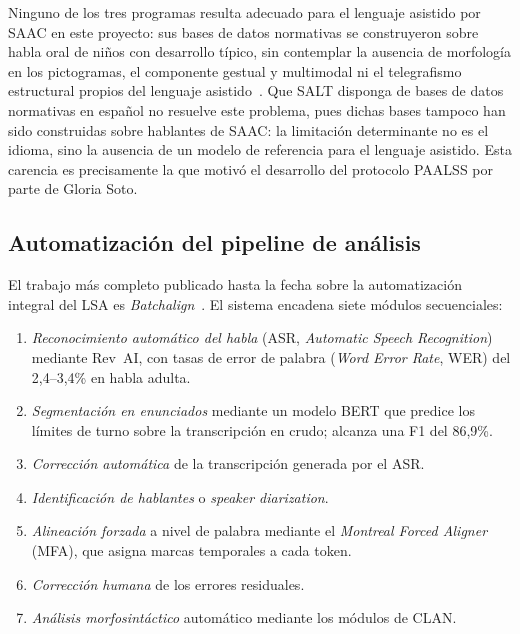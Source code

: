 Ninguno de los tres programas resulta adecuado para el lenguaje asistido por \ac{SAAC}
en este proyecto: sus bases de datos normativas se construyeron sobre habla oral de
niños con desarrollo típico, sin contemplar la ausencia de morfología en los
pictogramas, el componente gestual y multimodal ni el telegrafismo estructural propios
del lenguaje asistido~\cite{lsa_computer_programs}. Que \ac{SALT} disponga de bases de
datos normativas en español no resuelve este problema, pues dichas bases tampoco han
sido construidas sobre hablantes de \ac{SAAC}: la limitación determinante no es el
idioma, sino la ausencia de un modelo de referencia para el lenguaje asistido. Esta carencia es 
precisamente la que motivó el desarrollo del protocolo \ac{PAALSS} por parte de Gloria Soto.


\subsection{Automatización del pipeline de análisis}
\label{subsec:batchalign}

El trabajo más completo publicado hasta la fecha sobre la automatización integral del
\ac{LSA} es \emph{Batchalign}~\cite{lsa_automation_jslhr}. El sistema encadena siete módulos 
secuenciales:

\begin{enumerate}
  \item \emph{Reconocimiento automático del habla} (\ac{ASR}, \emph{Automatic Speech 
  Recognition}) mediante Rev~AI, con tasas de error de palabra (\emph{Word Error 
  Rate}, \ac{WER}) del 2{,}4--3{,}4\% en habla adulta.
  \item \emph{Segmentación en enunciados} mediante un modelo \ac{BERT} que predice los 
  límites de turno sobre la transcripción en crudo; alcanza una F1 del 86{,}9\%.
  \item \emph{Corrección automática} de la transcripción generada por el \ac{ASR}.
  \item \emph{Identificación de hablantes} o \emph{speaker diarization}.
  \item \emph{Alineación forzada} a nivel de palabra mediante el \emph{Montreal Forced 
  Aligner} (\ac{MFA}), que asigna marcas temporales a cada token.
  \item \emph{Corrección humana} de los errores residuales.
  \item \emph{Análisis morfosintáctico} automático mediante los módulos de \ac{CLAN}.
\end{enumerate}

